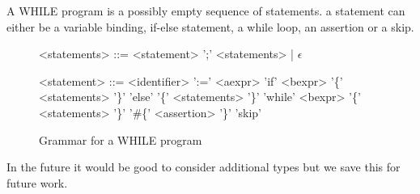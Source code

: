 A WHILE program is a possibly empty sequence of statements. a statement can either be
a variable binding, if-else statement, a while loop, an assertion or a skip.

\begin{figure}[h!]
\centering
\begin{grammar}
<statements> ::= <statement> ';' <statements> | $\epsilon$

<statement> ::= <identifier> ':=' <aexpr>
\alt 'if' <bexpr> '\{' <statements> '\}' 'else' '\{' <statements> '\}'
\alt 'while' <bexpr> '\{' <statements> '\}'
\alt '\#\{' <assertion> '\}'
\alt 'skip'
\end{grammar}
\label{fig:grammaraexpr}
\caption{Grammar for a WHILE program}
\end{figure}

In the future it would be good to consider additional types but we save this for future work.